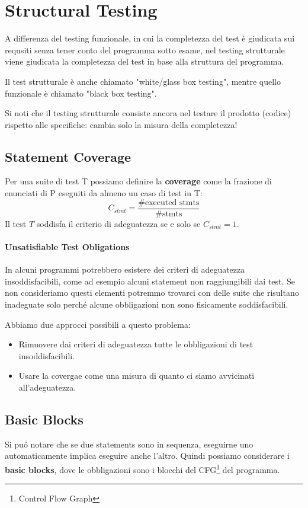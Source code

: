 
\section{Structural Testing}
A differenza del testing funzionale, in cui la completezza del test è giudicata sui requsiti senza tener conto del programma sotto esame,
nel testing strutturale viene giudicata la completezza del test in base alla struttura del programma.

Il test strutturale è anche chiamato "white/glass box testing", mentre quello funzionale è chiamato "black box testing".

Si noti che il testing strutturale consiste ancora nel testare il prodotto (codice) rispetto alle specifiche: cambia solo la misura della completezza!


\subsection{Statement Coverage}
Per una suite di test T possiamo definire la \textbf{coverage} come la frazione di enunciati di P eseguiti da almeno un caso di test in T:
\[ C_{stmt} = \frac{\text{\# executed stmts}}{\text{\# stmts}} \]
Il test $T$ soddisfa il criterio di adeguatezza se e solo se $C_{stmt} = 1$.



\paragraph*{Unsatisfiable Test Obligations}
In alcuni programmi potrebbero esistere dei criteri di adeguatezza insoddisfacibili, come ad esempio 
alcuni statement non raggiungibili dai test.
Se non consideriamo questi elementi potremmo trovarci con delle suite che risultano inadeguate solo perché alcune obbligazioni non sono fisicamente soddisfacibili.

Abbiamo due approcci possibili a questo problema:
\begin{itemize}
    \item Rimuovere dai criteri di adeguatezza tutte le obbligazioni di test insoddisfacibili.
    \item Usare la covergae come una misura di quanto ci siamo avvicinati all'adeguatezza.
\end{itemize}

\subsection{Basic Blocks}
Si puó notare che se due statements sono in sequenza, eseguirne uno automaticamente implica eseguire anche l'altro.
Quindi possiamo considerare i \textbf{basic blocks}, dove le obbligazioni sono i blocchi del CFG\footnote{Control Flow Graph} del programma.

